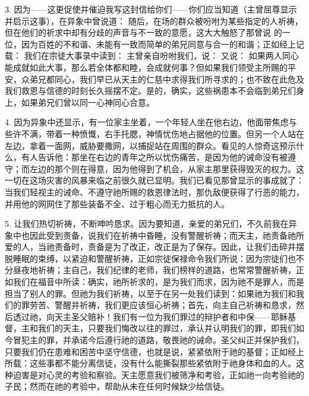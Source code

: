 3. 因为——这更促使并催迫我写这封信给你们——你们应当知道（主曾屈尊显示并启示这事），在异象中曾说道： 随后，在场的群众被吩咐为某些指定的人祈祷，但在他们的祈求中却有分歧的声音与不一致的意愿，这大大触怒了那曾说 的一位，因为百姓的不和谐、未能有一致而简单的弟兄同意与合一的和谐；正如经上记载： 我们在宗徒大事录中读到：  主曾亲自吩咐我们，说：  又说：  如果两人同心能成就如此大事，那么若全体都和睦，会成就何事？但如果我们领受主所赐的平安，众弟兄都同心，我们早已从天主的仁慈中求得我们所寻求的；也不致在此危及我们救恩与信德的时刻长久摇摆不定。是的，确实，这些祸患本不会临到弟兄们身上，如果弟兄们曾以同一心神同心合意。\par

4. 因为异象中还显示，有一位家主坐着，一个年轻人坐在他右边，他面带焦虑与些许不满，带着一种愤慨，右手托腮，神情忧伤地占据他的位置。但另一个人站在左边，拿着一面网，威胁要撒网，以捕捉站在周围的群众。看见的人惊奇这预示什么，有人告诉他：那坐在右边的青年之所以忧伤痛苦，是因为他的诫命没有被遵守；而左边的那个则在得意，因为他得到了机会，从家主那里获得毁灭的权力。这一切在这场灾害的风暴来临之前很久就已显明。我们已看见那曾显示的事成就了：当我们轻视主的诫命、不遵守祂所赐的救恩律法时，那仇敌便获得了行恶的能力，并用他的网网住了那些装备不全、过于粗心而无力抵抗的人。\par

5. 让我们热切祈祷，不断呻吟恳求。因为要知道，亲爱的弟兄们，不久前我在异象中也因此受到责备，说我们在祈祷中昏睡，没有警醒祈祷；而天主，祂责备祂所爱的人，当祂责备时，责备是为了改正，改正是为了保存。因此，让我们击碎并摆脱睡眠的束缚，以紧迫和警醒祈祷，正如宗徒保禄命令我们所说：因为宗徒们也不分昼夜地祈祷；主自己，我们纪律的老师，我们榜样的道路，也常常警醒祈祷，正如我们在福音中所读：确实，祂所祈求的，是为我们而求，因为祂不是罪人，而是担当了别人的罪。但祂为我们祈祷，以至于在另一处我们读到：如果祂为我们和我们的罪劳苦、警醒并祈祷，我们更应该恒心祈祷；首先，向主自己祈祷和恳求，然后透过祂，向天主圣父赔补！我们有一位为我们罪过的辩护者和中保——耶稣基督，主和我们的天主，只要我们悔改以往的罪过，承认并认明我们的罪，即我们如今冒犯主的罪，并承诺今后遵行祂的道路，敬畏祂的诫命。圣父纠正并保护我们，只要我们仍在患难和困苦中坚守信德，也就是说，紧紧依附于祂的基督；正如经上所载：这些事都不能分离信徒，没有什么能撕裂那些紧依附于祂身体和血的人。这种迫害是对心灵的考验和察验。天主愿意我们被筛净和考验，正如祂一向考验祂的子民；然而在祂的考验中，帮助从未在任何时候缺少给信徒。\par

